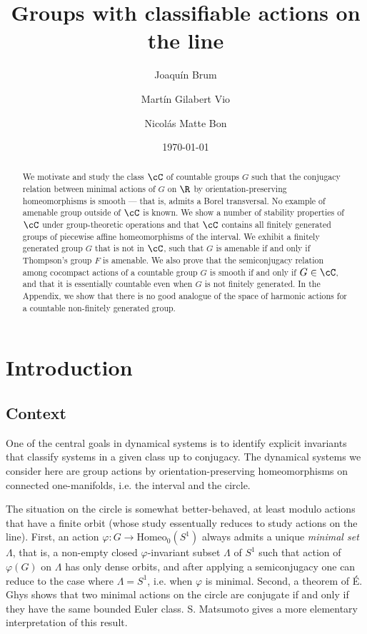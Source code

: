 \documentclass[reqno]{amsart}
\author[Joaqu\'in Brum]{Joaqu\'in Brum}
\author[Mart\'in Gilabert Vio]{Mart\'in Gilabert Vio}
\author[Nicol\'as Matte Bon]{Nicol\'as Matte Bon}
\date{\today}
\title{Groups with classifiable actions on the line}
\begin{document}
	
\begin{abstract}
We motivate and study the class $\cC$ of countable groups $G$ such that the conjugacy relation between minimal actions of $G$ on $\R$ by orientation-preserving homeomorphisms is smooth --- that is, admits a Borel transversal. No example of amenable group outside of $\cC$ is known.   We show a number of stability properties of $\cC$ under group-theoretic operations and that $\cC$ contains all finitely generated groups of piecewise affine homeomorphisms of the interval. We exhibit a finitely generated group $G$ that is not in $\cC$, such that $G$ is amenable if and only if Thompson's group $F$ is amenable. We also prove that the semiconjugacy relation among cocompact actions of a countable group $G$ is smooth if and only if $G \in \cC$, and that it is essentially countable even when $G$ is not finitely generated. In the Appendix, we show that there is no good analogue of the space of harmonic actions for a countable non-finitely generated group. 
\end{abstract}
	
\maketitle


\section{Introduction} \label{section:introduction}

\subsection{Context} One of the central goals in dynamical systems is to identify explicit invariants that classify systems in a given class up to conjugacy.  The dynamical systems we consider here are group actions by orientation-preserving homeomorphisms on connected one-manifolds, i.e. the interval and the circle. 

The situation on the circle is somewhat better-behaved, at least modulo actions that have a finite orbit (whose study essentually reduces to study actions on the line).  First, an action $\varphi \colon G \to \mathrm{Homeo}_0(S^1)$ always admits a unique \emph{minimal set} $\Lambda$, that is, a non-empty closed $\varphi$-invariant subset $\Lambda$ of $S^1$ such that action of $\varphi(G)$ on $\Lambda$ has only dense orbits, and after applying a semiconjugacy one can  reduce to the case where $\Lambda = S^1$, i.e. when $\varphi$ is minimal. Second, a theorem of É. Ghys \cite{Ghys1987} shows that two minimal actions on the circle are conjugate if and only if they have the same bounded Euler class. S. Matsumoto \cite{Matsumoto1986} gives a more elementary interpretation of this result.
\end{document}
